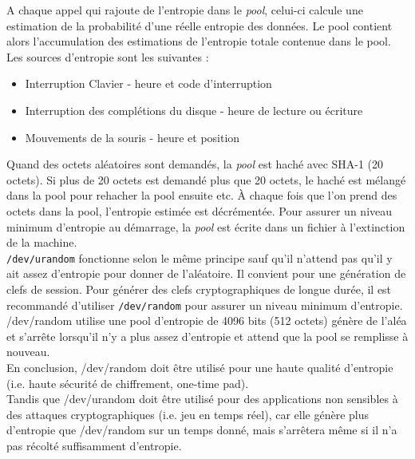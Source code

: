 			A chaque appel qui rajoute de l'entropie dans le \textit{pool}, 
			celui-ci calcule une estimation de la probabilité d'une réelle 
			entropie des données. 
			Le pool contient alors l'accumulation des estimations de l'entropie 
			totale contenue dans le pool.\\
						
			Les sources d'entropie sont les suivantes :
			\begin{itemize}
			\item Interruption Clavier - heure et code d'interruption 
			\item Interruption des complétions du disque - heure de 
			lecture ou écriture
			\item Mouvements de la souris - heure et position
			\end{itemize}
			
			Quand des octets aléatoires sont demandés, la \textit{pool} 
			est haché avec SHA-1 (20 octets). Si plus de 20 octets 
			est demandé plus que 20 octets, le haché est mélangé dans la pool 
			pour rehacher la pool ensuite etc. À chaque fois que l’on prend des 
			octets dans la pool, l’entropie estimée est décrémentée. 
			Pour assurer un niveau minimum d'entropie au démarrage, 
			la \textit{pool} est écrite dans un fichier à l'extinction 
			de la machine.\\
			
			\texttt{/dev/urandom} fonctionne selon le même principe sauf 
			qu'il n'attend pas qu'il y ait assez d'entropie pour donner de 
			l'aléatoire. Il convient pour une génération de clefs de session. 
			Pour générer des clefs cryptographiques de longue durée, il 
			est recommandé d'utiliser \texttt{/dev/random} pour assurer 
			un niveau minimum d'entropie.\\
			
			/dev/random utilise une pool d’entropie de 4096 bits 
			(512 octets) génère de l’aléa et s’arrête lorsqu’il n’y a 
			plus assez d’entropie et attend que la pool se remplisse 
			à nouveau.\\
			
			En conclusion, /dev/random doit être utilisé pour une haute qualité
			d'entropie (i.e. haute sécurité de chiffrement, one-time pad).\\
			Tandis que /dev/urandom doit être utilisé pour des applications non
			sensibles à des attaques cryptographiques (i.e. jeu en temps réel),
			car elle génère plus d'entropie que /dev/random sur un temps donné, 
			mais s'arrêtera même si il n'a pas récolté suffisamment d'entropie.

